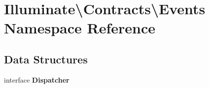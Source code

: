 \section{Illuminate\textbackslash{}Contracts\textbackslash{}Events Namespace Reference}
\label{namespace_illuminate_1_1_contracts_1_1_events}
\subsection*{Data Structures}
\begin{DoxyCompactItemize}
\item 
interface {\bf Dispatcher}
\end{DoxyCompactItemize}
